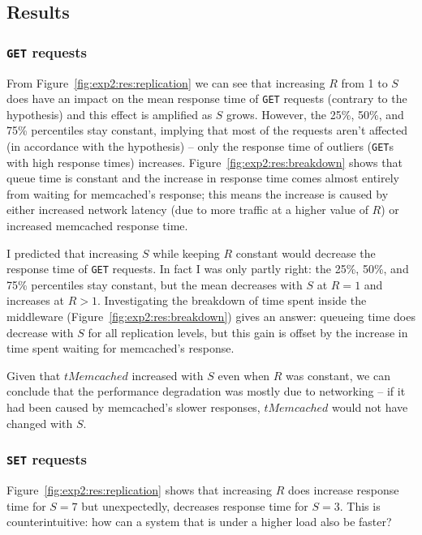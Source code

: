 \documentclass[11pt]{article}
\newcommand{\get}[0]{\texttt{GET}}
\newcommand{\set}[0]{\texttt{SET}}
\begin{document}
\subsection{Results}
\label{sec:exp2:res}

\subsubsection{\get{} requests}
From Figure~\ref{fig:exp2:res:replication} we can see that increasing $R$ from 1 to $S$ does have an impact on the mean response time of \get{} requests (contrary to the hypothesis) and this effect is amplified as $S$ grows. However, the 25\%, 50\%, and 75\% percentiles stay constant, implying that most of the requests aren't affected (in accordance with the hypothesis) -- only the response time of outliers (\get{}s with high response times) increases. Figure~\ref{fig:exp2:res:breakdown} shows that queue time is constant and the increase in response time comes almost entirely from waiting for memcached's response; this means the increase is caused by either increased network latency (due to more traffic at a higher value of $R$) or increased memcached response time.

I predicted that increasing $S$ while keeping $R$ constant would decrease the response time of \get{} requests. In fact I was only partly right: the 25\%, 50\%, and 75\% percentiles stay constant, but the mean decreases with $S$ at $R=1$ and increases at $R>1$. Investigating the breakdown of time spent inside the middleware (Figure~\ref{fig:exp2:res:breakdown}) gives an answer: queueing time does decrease with $S$ for all replication levels, but this gain is offset by the increase in time spent waiting for memcached's response.

Given that $tMemcached$ increased with $S$ even when $R$ was constant, we can conclude that the performance degradation was mostly due to networking -- if it had been caused by memcached's slower responses, $tMemcached$ would not have changed with $S$.

\subsubsection{\set{} requests}
\label{sec:exp2:res:set}

Figure~\ref{fig:exp2:res:replication} shows that increasing $R$ does increase response time for $S=7$ but unexpectedly, decreases response time for $S=3$. This is counterintuitive: how can a system that is under a higher load also be faster?
\end{document}
